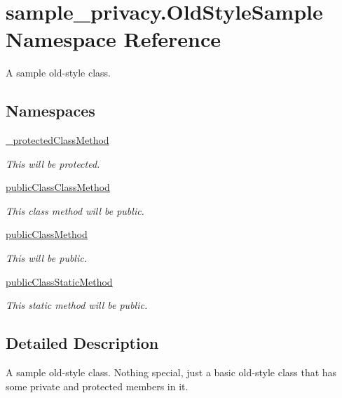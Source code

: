\hypertarget{namespacesample__privacy_1_1_old_style_sample}{\section{sample\-\_\-privacy.\-Old\-Style\-Sample Namespace Reference}
\label{namespacesample__privacy_1_1_old_style_sample}
}


A sample old-\/style class.  


\subsection*{Namespaces}
\begin{DoxyCompactItemize}
\item 
\hyperlink{namespacesample__privacy_1_1_old_style_sample_1_1__protected_class_method}{\-\_\-protected\-Class\-Method}
\begin{DoxyCompactList}\small\item\em This will be protected. \end{DoxyCompactList}\item 
\hyperlink{namespacesample__privacy_1_1_old_style_sample_1_1public_class_class_method}{public\-Class\-Class\-Method}
\begin{DoxyCompactList}\small\item\em This class method will be public. \end{DoxyCompactList}\item 
\hyperlink{namespacesample__privacy_1_1_old_style_sample_1_1public_class_method}{public\-Class\-Method}
\begin{DoxyCompactList}\small\item\em This will be public. \end{DoxyCompactList}\item 
\hyperlink{namespacesample__privacy_1_1_old_style_sample_1_1public_class_static_method}{public\-Class\-Static\-Method}
\begin{DoxyCompactList}\small\item\em This static method will be public. \end{DoxyCompactList}\end{DoxyCompactItemize}


\subsection{Detailed Description}
A sample old-\/style class. Nothing special, just a basic old-\/style class that has some private and protected members in it. 